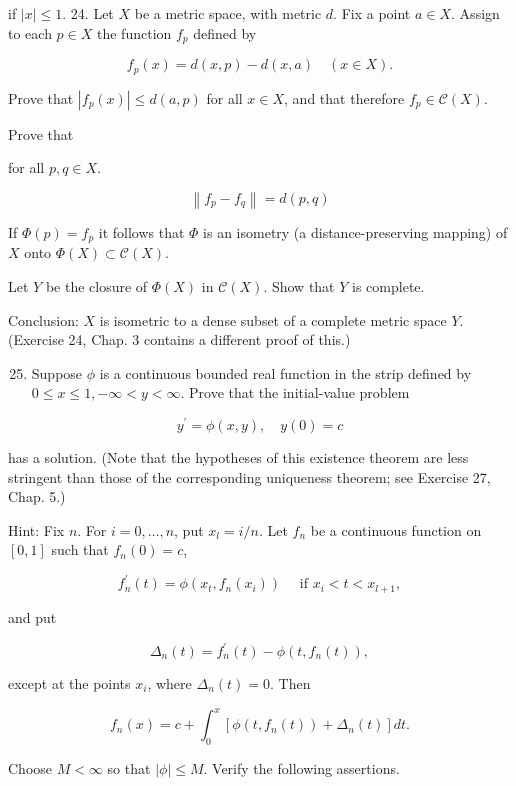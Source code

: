 \documentclass[10pt]{article}
\begin{document}
if $|x| \leq 1$. 24. Let $X$ be a metric space, with metric $d$. Fix a point $a \in X$. Assign to each $p \in X$ the function $f_{p}$ defined by

$$
f_{p}(x)=d(x, p)-d(x, a) \quad(x \in X) .
$$

Prove that $\left|f_{p}(x)\right| \leq d(a, p)$ for all $x \in X$, and that therefore $f_{p} \in \mathscr{C}(X)$.

Prove that

for all $p, q \in X$.

$$
\left\|f_{p}-f_{q}\right\|=d(p, q)
$$

If $\Phi(p)=f_{p}$ it follows that $\Phi$ is an isometry (a distance-preserving mapping) of $X$ onto $\Phi(X) \subset \mathscr{C}(X)$.

Let $Y$ be the closure of $\Phi(X)$ in $\mathscr{C}(X)$. Show that $Y$ is complete.

Conclusion: $X$ is isometric to a dense subset of a complete metric space $Y$. (Exercise 24, Chap. 3 contains a different proof of this.)

\begin{enumerate}
  \setcounter{enumi}{24}
  \item Suppose $\phi$ is a continuous bounded real function in the strip defined by $0 \leq x \leq 1,-\infty<y<\infty$. Prove that the initial-value problem
\end{enumerate}

$$
y^{\prime}=\phi(x, y), \quad y(0)=c
$$

has a solution. (Note that the hypotheses of this existence theorem are less stringent than those of the corresponding uniqueness theorem; see Exercise 27, Chap. 5.)

Hint: Fix $n$. For $i=0, \ldots, n$, put $x_{l}=i / n$. Let $f_{n}$ be a continuous function on $[0,1]$ such that $f_{n}(0)=c$,

$$
f_{n}^{\prime}(t)=\phi\left(x_{t}, f_{n}\left(x_{i}\right)\right) \quad \text { if } x_{i}<t<x_{l+1},
$$

and put

$$
\Delta_{n}(t)=f_{n}^{\prime}(t)-\phi\left(t, f_{n}(t)\right),
$$

except at the points $x_{i}$, where $\Delta_{n}(t)=0$. Then

$$
f_{n}(x)=c+\int_{0}^{x}\left[\phi\left(t, f_{n}(t)\right)+\Delta_{n}(t)\right] d t .
$$

Choose $M<\infty$ so that $|\phi| \leq M$. Verify the following assertions.
\end{document}
